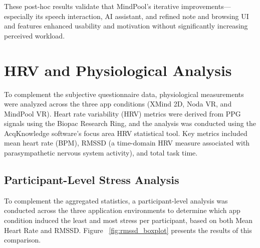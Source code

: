 \documentclass{CPP}
\begin{document}
These post-hoc results validate that MindPool’s iterative improvements—especially its speech interaction, AI assistant, and refined note and browsing UI and features enhanced usability and motivation without significantly increasing perceived workload.








\section{HRV and Physiological Analysis}

To complement the subjective questionnaire data, physiological measurements were analyzed across the three app conditions (XMind 2D, Noda VR, and MindPool VR). Heart rate variability (HRV) metrics were derived from PPG signals using the Biopac Research Ring, and the analysis was conducted using the AcqKnowledge software’s focus area HRV statistical tool. Key metrics included mean heart rate (BPM), RMSSD (a time-domain HRV measure associated with parasympathetic nervous system activity), and total task time.


\subsection{Participant-Level Stress Analysis}

To complement the aggregated statistics, a participant-level analysis was conducted across the three application environments to determine which app condition induced the least and most stress per participant, based on both Mean Heart Rate and RMSSD. Figure ~\ref{fig:rmssd_boxplot} presents the results of this comparison.
\end{document}
